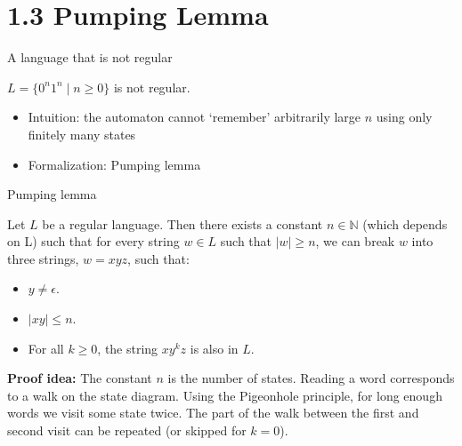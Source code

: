 \documentclass[handout]{beamer}
\begin{document}
\section{1.3 Pumping Lemma}


\begin{frame}{A language that is not regular}

    \begin{example}
        $L=\{0^n1^n \mid  n\geq 0\}$ is not regular.
    \end{example}

    \begin{itemize}
        \item \alert{Intuition:} the automaton cannot `remember' arbitrarily large $n$ using only finitely many states    
    
        \item \alert{Formalization:} Pumping lemma
    \end{itemize}
    
\end{frame}


\begin{frame}{Pumping lemma}

    \begin{theorem}
		Let $L$ be a regular language. Then there exists a constant $n\in \mathbb{N}$ (which depends on L) such that for every string $w\in L$ such that $|w|\geq n$, we can break $w$ into three strings, $w=xyz$, such that:
		
		\begin{itemize}
			\item $y\neq \epsilon$.
			\item $|xy|\leq n$.
			\item For all $k\geq 0$, the string $xy^kz$ is also in $L$.
		\end{itemize}
	\end{theorem}

    \textbf{Proof idea:} The constant $n$ is the number of states. Reading a word corresponds to a walk on the state diagram. Using the Pigeonhole principle, for long enough words we visit some state twice. The part of the walk between the first and second visit can be repeated (or skipped for $k=0$).

\end{frame}
\end{document}
